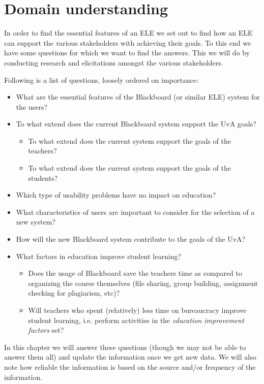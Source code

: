 \chapter{Domain understanding}
\label{ch:understanding} 
In order to find the essential features of an ELE we set out to find how an ELE can support the various stakeholders with achieving their goals. To this end we have some questions for which we want to find the answers. This we will do by conducting research and elicitations amongst the various stakeholders.

Following is a list of questions, loosely ordered on importance:
\begin{itemize}
	\item What are the essential features of the Blackboard (or similar ELE) system for the users?

	\item To what extend does the current Blackboard system support the UvA goals?
	\begin{itemize}
		\item To what extend does the current system support the goals of the teachers?
		\item To what extend does the current system support the goals of the students?
	\end{itemize}
	
	\item Which type of usability problems have no impact on education?
	\item What characteristics of users are important to consider for the selection of a new system?
	\item How will the new Blackboard system contribute to the goals of the UvA?
	\item What factors in education improve student learning?
		\begin{itemize}
			\item Does the usage of Blackboard save the teachers time as compared to organizing the course themselves (file sharing, group building, assignment checking for plagiarism, etc)?
			\item Will teachers who spent (relatively) less time on bureaucracy improve student learning, i.e. perform activities in the \textit{education improvement factors} set?
		\end{itemize}
	
\end{itemize}

In this chapter we will answer these questions (though we may not be able to answer them all) and update the information once we get new data. We will also note how reliable the information is based on the source and/or frequency of the information.


